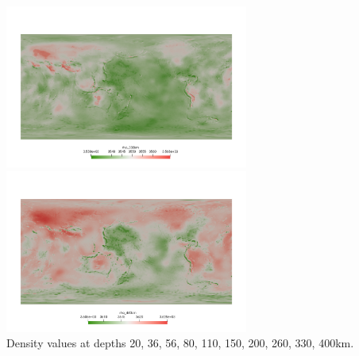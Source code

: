\begin{center}
\includegraphics[width=8cm]{python_codes/fieldstone_99/images/rho_330}
\includegraphics[width=8cm]{python_codes/fieldstone_99/images/rho_400}\\
{\captionfont Density values at depths 20, 36, 56, 80, 110, 150, 200, 260, 330, 400km.}
\end{center}


